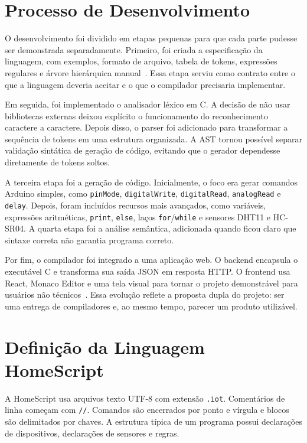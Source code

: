 \documentclass[conference]{IEEEtran}
\begin{document}
\section{Processo de Desenvolvimento}

O desenvolvimento foi dividido em etapas pequenas para que cada parte pudesse ser demonstrada separadamente. Primeiro, foi criada a especificação da linguagem, com exemplos, formato de arquivo, tabela de tokens, expressões regulares e árvore hierárquica manual~\cite{docs-def,docs-tokens}. Essa etapa serviu como contrato entre o que a linguagem deveria aceitar e o que o compilador precisaria implementar.

Em seguida, foi implementado o analisador léxico em C. A decisão de não usar bibliotecas externas deixou explícito o funcionamento do reconhecimento caractere a caractere. Depois disso, o parser foi adicionado para transformar a sequência de tokens em uma estrutura organizada. A AST tornou possível separar validação sintática de geração de código, evitando que o gerador dependesse diretamente de tokens soltos.

A terceira etapa foi a geração de código. Inicialmente, o foco era gerar comandos Arduino simples, como \texttt{pinMode}, \texttt{digitalWrite}, \texttt{digitalRead}, \texttt{analogRead} e \texttt{delay}. Depois, foram incluídos recursos mais avançados, como variáveis, expressões aritméticas, \texttt{print}, \texttt{else}, laços \texttt{for}/\texttt{while} e sensores DHT11 e HC-SR04. A quarta etapa foi a análise semântica, adicionada quando ficou claro que sintaxe correta não garantia programa correto.

Por fim, o compilador foi integrado a uma aplicação web. O backend encapsula o executável C e transforma sua saída JSON em resposta HTTP. O frontend usa React, Monaco Editor e uma tela visual para tornar o projeto demonstrável para usuários não técnicos~\cite{fastapi,react,monaco}. Essa evolução reflete a proposta dupla do projeto: ser uma entrega de compiladores e, ao mesmo tempo, parecer um produto utilizável.

\section{Definição da Linguagem HomeScript}

A HomeScript usa arquivos texto UTF-8 com extensão \texttt{.iot}. Comentários de linha começam com \texttt{//}. Comandos são encerrados por ponto e vírgula e blocos são delimitados por chaves. A estrutura típica de um programa possui declarações de dispositivos, declarações de sensores e regras.
\end{document}
